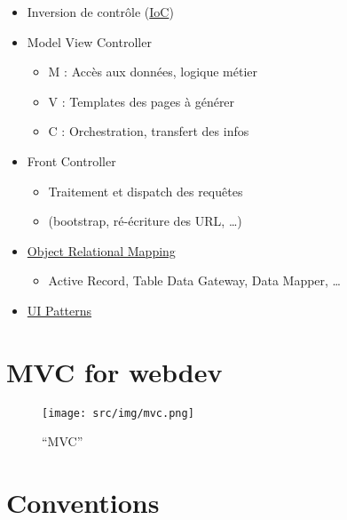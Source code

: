 \begin{itemize}
\tightlist
\item
  Inversion de contrôle
  (\href{http://martinfowler.com/bliki/InversionOfControl.html}{IoC})
\item
  Model View Controller

  \begin{itemize}
  \tightlist
  \item
    M : Accès aux données, logique métier
  \item
    V : Templates des pages à générer
  \item
    C : Orchestration, transfert des infos
  \end{itemize}
\item
  Front Controller

  \begin{itemize}
  \tightlist
  \item
    Traitement et dispatch des requêtes
  \item
    (bootstrap, ré-écriture des URL, \ldots{})
  \end{itemize}
\item
  \href{https://web.archive.org/web/20160316065751/http://blog.mazenod.fr/2010/01/design-pattern-mvc-zoom-sur-la-couche-modele-dal-dao-orm-crud/}{Object
  Relational Mapping}

  \begin{itemize}
  \tightlist
  \item
    Active Record, Table Data Gateway, Data Mapper, \ldots{}
  \end{itemize}
\item
  \href{http://ui-patterns.com/}{UI Patterns}
\end{itemize}

\hypertarget{mvc-for-webdev}{%
\section{MVC for webdev}\label{mvc-for-webdev}}

\begin{figure}
\centering
\texttt{[image: src/img/mvc.png]}
\caption{``MVC''}
\end{figure}

\hypertarget{conventions}{%
\section{Conventions}\label{conventions}}

